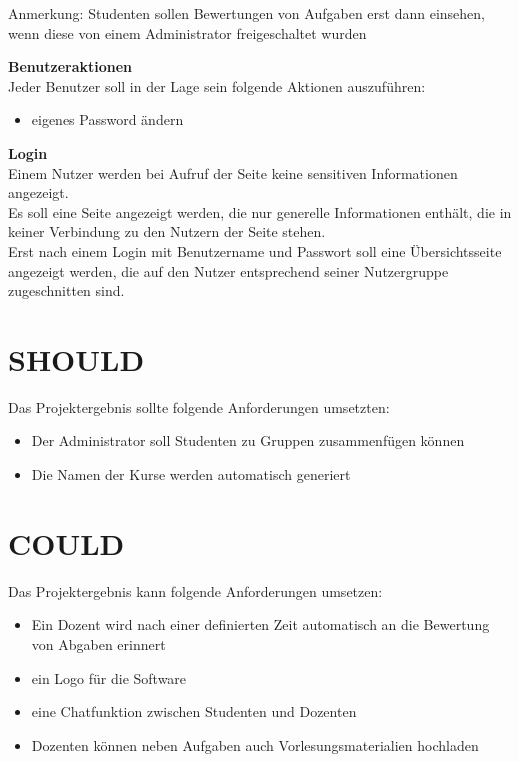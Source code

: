 Anmerkung: Studenten sollen Bewertungen von Aufgaben erst dann einsehen, wenn diese von einem Administrator freigeschaltet wurden

\textbf{Benutzeraktionen} \\
Jeder Benutzer soll in der Lage sein folgende Aktionen auszuführen:
\begin{itemize}
\item eigenes Password ändern
\end{itemize}

\textbf{Login} \\
Einem Nutzer werden bei Aufruf der Seite keine sensitiven Informationen angezeigt. \\
Es soll eine Seite angezeigt werden, die nur generelle Informationen enthält, die in keiner Verbindung zu den Nutzern der Seite stehen. \\
Erst nach einem Login mit Benutzername und Passwort soll eine Übersichtsseite angezeigt werden, die auf den Nutzer entsprechend seiner Nutzergruppe zugeschnitten sind. \\

\section{SHOULD}
Das Projektergebnis sollte folgende Anforderungen umsetzten:
\begin{itemize}
\item Der Administrator soll Studenten zu Gruppen zusammenfügen können
\item Die Namen der Kurse werden automatisch generiert
\end{itemize}

\section{COULD}
Das Projektergebnis kann folgende Anforderungen umsetzen:
\begin{itemize}
\item Ein Dozent wird nach einer definierten Zeit automatisch an die Bewertung von Abgaben erinnert
\item ein Logo für die Software
\item eine Chatfunktion zwischen Studenten und Dozenten
\item Dozenten können neben Aufgaben auch Vorlesungsmaterialien hochladen
\end{itemize}





